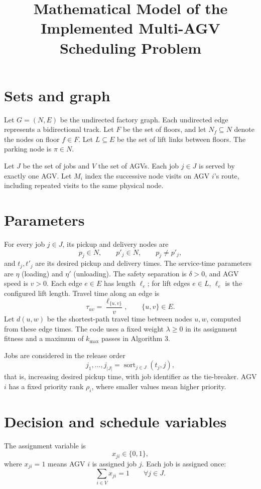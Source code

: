 \documentclass[11pt]{article}
\title{Mathematical Model of the Implemented Multi-AGV Scheduling Problem}
\author{}
\date{}
\begin{document}
\maketitle

\section{Sets and graph}

Let $G=(N,E)$ be the undirected factory graph. Each undirected edge represents a
bidirectional track. Let $F$ be the set of floors, and let $N_f\subseteq N$
denote the nodes on floor $f\in F$. Let $L\subseteq E$ be the set of lift links
between floors. The parking node is $\pi\in N$.

Let $J$ be the set of jobs and $V$ the set of AGVs. Each job $j\in J$ is served
by exactly one AGV. Let $M_i$ index the successive node visits on AGV $i$'s
route, including repeated visits to the same physical node.

\section{Parameters}

For every job $j\in J$, its pickup and delivery nodes are
\[
  p_j\in N,\qquad p'_j\in N,\qquad p_j\ne p'_j,
\]
and $t_j,t'_j$ are its desired pickup and delivery times. The service-time
parameters are $\eta$ (loading) and $\eta'$ (unloading). The safety separation
is $\delta>0$, and AGV speed is $v>0$. Each edge $e\in E$ has length $\ell_e$;
for lift edges $e\in L$, $\ell_e$ is the configured lift length. Travel time
along an edge is
\[
  \tau_{uv}=\frac{\ell_{\{u,v\}}}{v},\qquad \{u,v\}\in E.
\]
Let $d(u,w)$ be the shortest-path travel time between nodes $u,w$, computed
from these edge times. The code uses a fixed weight $\lambda\ge 0$ in its
assignment fitness and a maximum of $k_{\max}$ passes in Algorithm 3.

Jobs are considered in the release order
\[
  j_1,\ldots,j_{|J|}
  =\operatorname{sort}_{j\in J}(t_j,j),
\]
that is, increasing desired pickup time, with job identifier as the tie-breaker.
AGV $i$ has a fixed priority rank $\rho_i$, where smaller values mean higher
priority.

\section{Decision and schedule variables}

The assignment variable is
\[
  x_{ji}\in\{0,1\},
\]
where $x_{ji}=1$ means AGV $i$ is assigned job $j$. Each job is assigned once:
\[
  \sum_{i\in V}x_{ji}=1\qquad \forall j\in J.
\]
\end{document}
